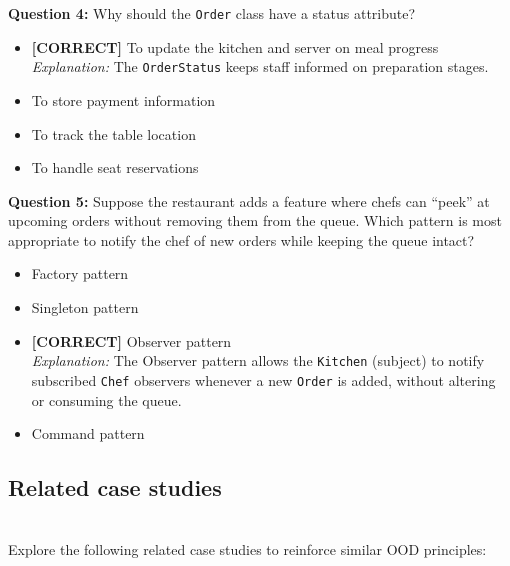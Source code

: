 \vspace{0.3cm}
\noindent
\textbf{Question 4:} Why should the \texttt{Order} class have a status attribute?
\\[0.2cm]
\begin{itemize}
 \item \textbf{[CORRECT]} To update the kitchen and server on meal progress
\\[0.1cm]
\textit{Explanation:} 
The \texttt{OrderStatus} keeps staff informed on preparation stages.
 \item To store payment information
 \item To track the table location
 \item To handle seat reservations
\end{itemize}
\vspace{0.3cm}
\noindent
\textbf{Question 5:} Suppose the restaurant adds a feature where chefs can ``peek'' at upcoming orders without removing them from the queue. Which pattern is most appropriate to notify the chef of new orders while keeping the queue intact?
\\[0.2cm]
\begin{itemize}
 \item Factory pattern
 \item Singleton pattern
 \item \textbf{[CORRECT]} Observer pattern
\\[0.1cm]
\textit{Explanation:} 
The Observer pattern allows the \texttt{Kitchen} (subject) to notify subscribed \texttt{Chef} observers whenever a new \texttt{Order} is added, without altering or consuming the queue.
 \item Command pattern
\end{itemize}

\subsection{Related case studies}\label{2Su-hB_WLi1U-ryOAZxp8}
\\
Explore the following related case studies to reinforce similar OOD principles:

